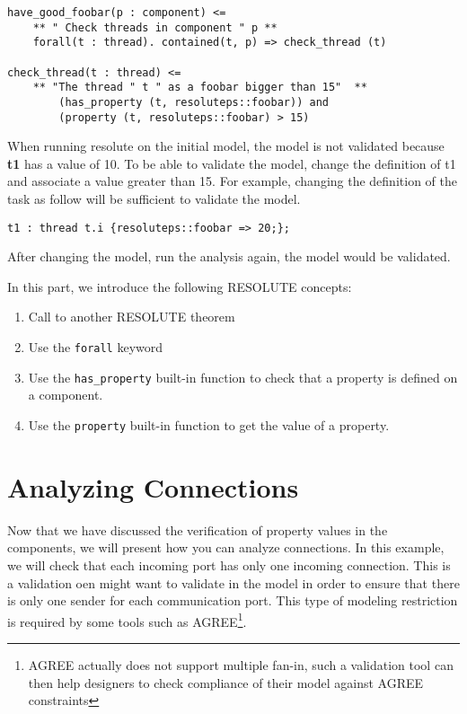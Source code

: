 \documentclass[times, 10pt]{article}
\begin{document}
\begin{lstlisting}
have_good_foobar(p : component) <=
	** " Check threads in component " p **
    forall(t : thread). contained(t, p) => check_thread (t)

check_thread(t : thread) <=
  	** "The thread " t " as a foobar bigger than 15"  **
  		(has_property (t, resoluteps::foobar)) and 
  		(property (t, resoluteps::foobar) > 15)
\end{lstlisting}

When running resolute on the initial model, the model
is not validated because \textbf{t1} has
a value of 10. To be able to validate the model,
change the definition of t1 and associate a value greater
than 15. For example, changing the definition
of the task as follow will be sufficient to validate the model.

\begin{lstlisting}
t1 : thread t.i {resoluteps::foobar => 20;};
\end{lstlisting}

After changing the model, run the analysis again, the
model would be validated.

In this part, we introduce the following RESOLUTE concepts:
\begin{enumerate}
    \item
        Call to another RESOLUTE theorem
    \item
        Use the \texttt{forall} keyword
    \item
        Use the \texttt{has\_property} built-in function to check
        that a property is defined on a component.
    \item
        Use the \texttt{property} built-in function to get the value
        of a property.
\end{enumerate}



\section{Analyzing Connections}
Now that we have discussed the verification of property values
in the components, we will present how you can analyze connections.
In this example, we will check that each incoming port
has only one incoming connection. This is a validation
oen might want to validate in the model in order to ensure
that there is only one sender for each communication port.
This type of modeling restriction is required by some tools such
as AGREE\footnote{AGREE actually does not support multiple fan-in, such
a validation tool can then help designers to check compliance of their model
against AGREE constraints}.
\end{document}
